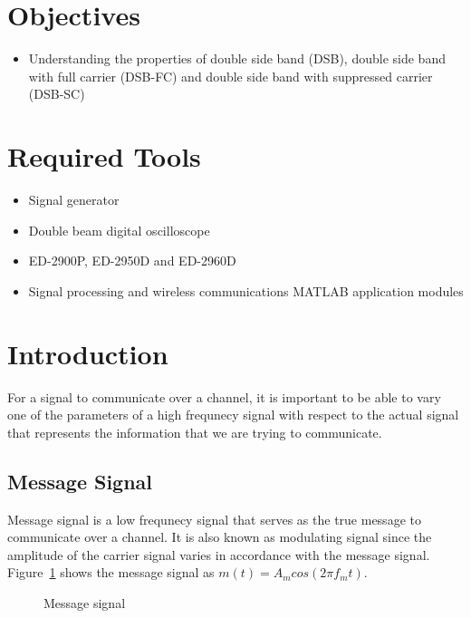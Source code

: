 \documentclass{lab_sheet}
\begin{document}
    \tableofcontents
    \pagebreak
    \section{Objectives}
    \begin{itemize}
        \item Understanding the properties of double side band (DSB), double side band with full carrier (DSB-FC) and double side band with suppressed carrier (DSB-SC)
    \end{itemize}
    \section{Required Tools}
    \begin{itemize}
        \item Signal generator
        \item Double beam digital oscilloscope
        \item ED-2900P, ED-2950D and ED-2960D
        \item Signal processing and wireless communications MATLAB application modules
    \end{itemize}
\section{Introduction}
For a signal to communicate over a channel, it is important to be able to vary one of the parameters of a high frequnecy signal with respect to the actual signal that represents the information that we are trying to communicate. 
\subsection{Message Signal}
Message signal is a low frequnecy signal that serves as the true message to communicate over a channel. It is also known as modulating signal since the amplitude of the carrier signal varies in accordance with the message signal. Figure~\ref{fig:msg} shows the message signal as $m(t)=A_m cos(2\pi f_m t)$.
    \begin{figure}[H]
        \centering
          \caption{Message signal}
          \label{fig:msg}
    \end{figure}
\end{document}
